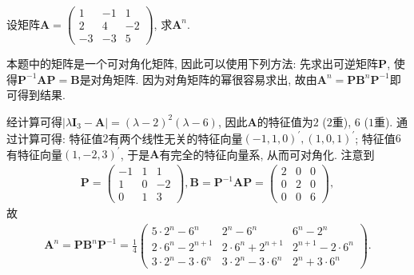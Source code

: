 \documentclass[../../main.tex]{subfiles}%
\begin{document}
\begin{example}
设矩阵\(\boldsymbol{A}=\begin{pmatrix}
1&-1&1\\
2&4&-2\\
-3&-3&5
\end{pmatrix}\), 求\(\boldsymbol{A}^{n}\).
\end{example}
\begin{note}
本题中的矩阵是一个可对角化矩阵, 因此可以使用下列方法: 先求出可逆矩阵\(\boldsymbol{P}\), 使得\(\boldsymbol{P}^{-1}\boldsymbol{AP}=\boldsymbol{B}\)是对角矩阵. 因为对角矩阵的幂很容易求出, 故由\(\boldsymbol{A}^{n}=\boldsymbol{P}\boldsymbol{B}^{n}\boldsymbol{P}^{-1}\)即可得到结果.
\end{note}
\begin{solution}
    
经计算可得\(\vert\lambda\boldsymbol{I}_{3}-\boldsymbol{A}\vert = (\lambda - 2)^{2}(\lambda - 6)\), 因此\(\boldsymbol{A}\)的特征值为\(2\) (\(2\)重), \(6\) (\(1\)重). 通过计算可得: 特征值\(2\)有两个线性无关的特征向量\((-1,1,0)^{\prime},(1,0,1)^{\prime}\); 特征值\(6\)有特征向量\((1,-2,3)^{\prime}\), 于是\(\boldsymbol{A}\)有完全的特征向量系, 从而可对角化. 注意到
\begin{align*}
\boldsymbol{P}=\begin{pmatrix}
-1&1&1\\
1&0&-2\\
0&1&3
\end{pmatrix}, \boldsymbol{B}=\boldsymbol{P}^{-1}\boldsymbol{AP}=\begin{pmatrix}
2&0&0\\
0&2&0\\
0&0&6
\end{pmatrix},
\end{align*}
故
\begin{align*}
\boldsymbol{A}^{n}=\boldsymbol{P}\boldsymbol{B}^{n}\boldsymbol{P}^{-1}=\frac{1}{4}\begin{pmatrix}
5\cdot 2^{n}-6^{n}&2^{n}-6^{n}&6^{n}-2^{n}\\
2\cdot 6^{n}-2^{n + 1}&2\cdot 6^{n}+2^{n + 1}&2^{n + 1}-2\cdot 6^{n}\\
3\cdot 2^{n}-3\cdot 6^{n}&3\cdot 2^{n}-3\cdot 6^{n}&2^{n}+3\cdot 6^{n}
\end{pmatrix}.
\end{align*} 

\end{solution}
\end{document}
